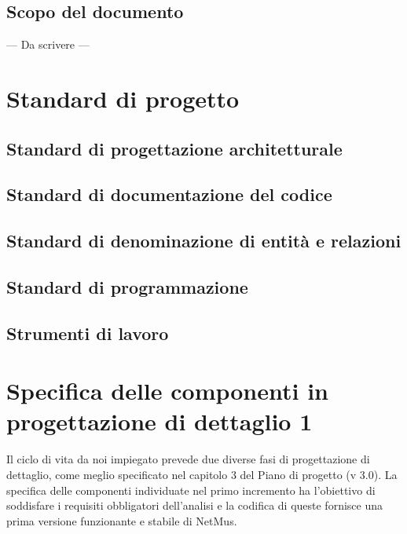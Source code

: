 \section{Scopo del documento}
--- Da scrivere ---



\chapter{Standard di progetto}
\thispagestyle{fancy} %

\section{Standard di progettazione architetturale}
\section{Standard di documentazione del codice}
\section{Standard di denominazione di entit\`a e relazioni}
\section{Standard di programmazione}
\section{Strumenti di lavoro}

\chapter{Specifica delle componenti in progettazione di dettaglio 1}
\thispagestyle{fancy} %
Il ciclo di vita da noi impiegato prevede due diverse fasi di progettazione di
dettaglio, come meglio specificato nel capitolo 3 del Piano di progetto (v
3.0). La specifica delle componenti individuate nel primo incremento ha
l'obiettivo di soddisfare i requisiti obbligatori dell'analisi e la codifica di
queste fornisce una prima versione funzionante e stabile di NetMus. 
